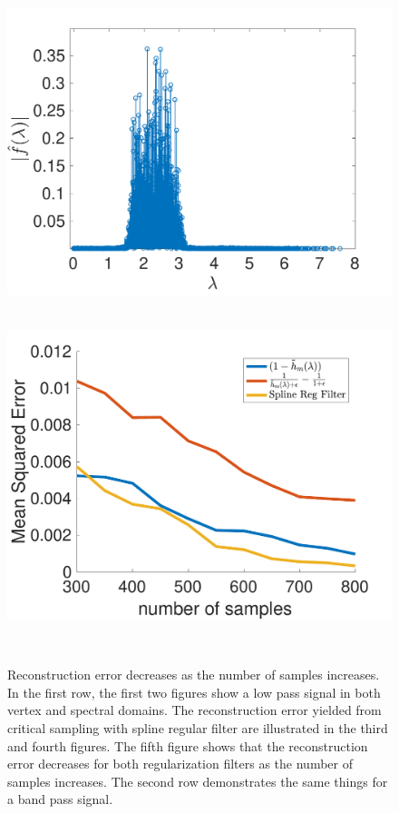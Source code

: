 \documentclass[a4paper]{article}
\theoremstyle{definition}
\begin{document}
\begin{figure}[bth]
\begin{minipage}[m]{0.16\linewidth}
\end{minipage}
\begin{minipage}[m]{0.16\linewidth}
\centerline{~~\includegraphics[width=.85\linewidth]{fig_spline_filter_error_spectral_band_pass_bunny}}
\end{minipage}
\begin{minipage}[m]{0.16\linewidth}
\centerline{~~\includegraphics[width=.85\linewidth]{fig_samples_error_trade_off_band_pass}}
\end{minipage}\\

\caption{Reconstruction error decreases as the number of samples increases. In the first row, the first two figures show a low pass signal in both vertex and spectral domains. The reconstruction error yielded from critical sampling with spline regular filter are illustrated in the third and fourth figures. The fifth figure shows that the reconstruction error decreases for both regularization filters as the number of samples increases. The second row demonstrates the same things for a band pass signal.}
\end{figure}
\end{document}
